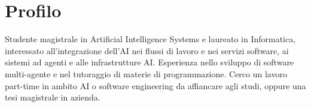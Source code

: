 \section{Profilo}

Studente magistrale in Artificial Intelligence Systems e laureato in Informatica, interessato all'integrazione dell'AI nei flussi di lavoro e nei servizi software, ai sistemi ad agenti e alle infrastrutture AI. Esperienza nello sviluppo di software multi-agente e nel tutoraggio di materie di programmazione. Cerco un lavoro part-time in ambito AI o software engineering da affiancare agli studi, oppure una tesi magistrale in azienda.
